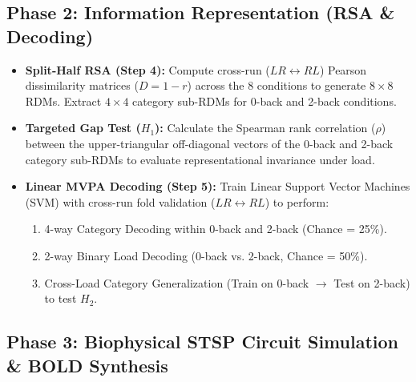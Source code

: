 \documentclass[11pt,a4paper]{article}
\begin{document}
\subsection{Phase 2: Information Representation (RSA \& Decoding)}

\begin{itemize}
    \item \textbf{Split-Half RSA (Step 4):} Compute cross-run ($LR \leftrightarrow RL$) Pearson dissimilarity matrices ($D = 1 - r$) across the 8 conditions to generate $8 \times 8$ RDMs. Extract $4 \times 4$ category sub-RDMs for 0-back and 2-back conditions.
    \item \textbf{Targeted Gap Test ($H_1$):} Calculate the Spearman rank correlation ($\rho$) between the upper-triangular off-diagonal vectors of the 0-back and 2-back category sub-RDMs to evaluate representational invariance under load.
    \item \textbf{Linear MVPA Decoding (Step 5):} Train Linear Support Vector Machines (SVM) with cross-run fold validation ($LR \leftrightarrow RL$) to perform:
    \begin{enumerate}
        \item 4-way Category Decoding within 0-back and 2-back (Chance = 25\%).
        \item 2-way Binary Load Decoding (0-back vs. 2-back, Chance = 50\%).
        \item Cross-Load Category Generalization (Train on 0-back $\rightarrow$ Test on 2-back) to test $H_2$.
    \end{enumerate}
\end{itemize}

\subsection{Phase 3: Biophysical STSP Circuit Simulation \& BOLD Synthesis}
\end{document}
